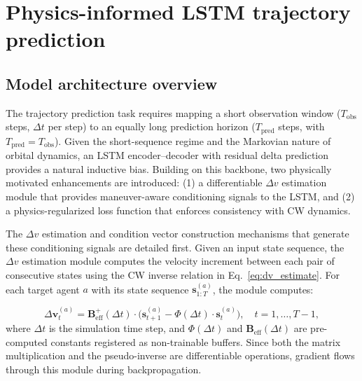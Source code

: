 \documentclass[a4paper,fleqn]{cas-dc}
\newcommand{\biPhi}{\bm{\mathit{\Phi}}} %
\begin{document}
\section{Physics-informed LSTM trajectory prediction}\label{sec:trajectory}

\subsection{Model architecture overview}

The trajectory prediction task requires mapping a short observation window ($T_{\text{obs}}$ steps, $\Delta t$ per step) to an equally long prediction horizon ($T_{\text{pred}}$ steps, with $T_{\text{pred}} = T_{\text{obs}}$). Given the short-sequence regime and the Markovian nature of orbital dynamics, an LSTM encoder--decoder with residual delta prediction provides a natural inductive bias. Building on this backbone, two physically motivated enhancements are introduced: (1) a differentiable $\Delta v$ estimation module that provides maneuver-aware conditioning signals to the LSTM, and (2) a physics-regularized loss function that enforces consistency with CW dynamics.

The $\Delta v$ estimation and condition vector construction mechanisms that generate these conditioning signals are detailed first. Given an input state sequence, the $\Delta v$ estimation module computes the velocity increment between each pair of consecutive states using the CW inverse relation in Eq.~\eqref{eq:dv_estimate}. For each target agent $a$ with its state sequence $\bm{s}^{(a)}_{1:T}$, the module computes:

\begin{equation}
    \Delta \bm{v}^{(a)}_t = \bm{B}_{\text{eff}}^+(\Delta t) \cdot \bigl(\bm{s}^{(a)}_{t+1} - \biPhi(\Delta t) \cdot \bm{s}^{(a)}_t\bigr), \quad t = 1, \dots, T-1,
\end{equation}
where $\Delta t$ is the simulation time step, and $\biPhi(\Delta t)$ and $\bm{B}_{\text{eff}}(\Delta t)$ are pre-computed constants registered as non-trainable buffers. Since both the matrix multiplication and the pseudo-inverse are differentiable operations, gradient flows through this module during backpropagation.
\end{document}
